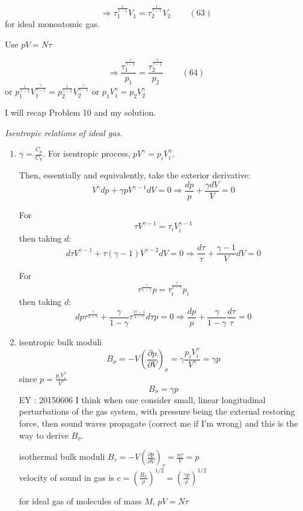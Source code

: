 \begin{equation}
  \Longrightarrow \tau_1^{\frac{1}{\gamma-1}}V_1 = \tau_2^{\frac{1}{\gamma-1}}V_2 \quad \quad \, (63)
\end{equation}
for ideal monoatomic gas.  

Use $pV = N\tau$

\begin{equation}
\Longrightarrow \frac{ \tau_1^{\frac{\gamma}{\gamma-1}} }{p_1} = \frac{ \tau_2^{\frac{\gamma}{\gamma-1}} }{p_2} \quad \quad \, (64)
\end{equation}
or $p_1^{\frac{1}{\gamma-1}}V_1^{\frac{\gamma}{\gamma-1}} = p_2^{\frac{1}{\gamma-1}}V_2^{\frac{\gamma}{\gamma-1}}$ or $p_1V_1^{\gamma} = p_2 V_2^{\gamma}$

I will recap Problem 10 and my solution.  

\emph{Isentropic relations of ideal gas.}

\begin{enumerate}
  \item[(a)] $\gamma = \frac{C_p}{C_V}$.  For isentropic process, $pV^{\gamma} = p_i V_i^{\gamma}$.  

Then, essentially and equivalently, take the exterior derivative:
\[
V^{\gamma}dp + \gamma p V^{\gamma -1} dV = 0 \Longrightarrow \frac{dp}{p} + \frac{\gamma dV}{ V} = 0 
\]

For 
\[
\tau V^{\gamma-1} = \tau_i V_i^{\gamma-1}
\]
then taking $d$:
\[
d\tau V^{\gamma-1} + \tau(\gamma -1) V^{\gamma -2} dV = 0 \Longrightarrow \frac{d\tau}{\tau } + \frac{ \gamma -1}{V} dV = 0 
\]

For 
\[
\tau^{ \frac{ \gamma}{ 1 - \gamma }} p = \tau_i^{\frac{ \gamma}{ 1 - \gamma } } p_i
\]
then taking $d$:
\[
dp \tau^{ \frac{\gamma}{1- \gamma }} + \frac{ \gamma }{ 1 - \gamma} \tau^{ \frac{2 \gamma -1 }{ 1- \gamma }} d\tau p = 0 \Longrightarrow \frac{dp}{p} + \frac{ \gamma }{ 1 - \gamma} \frac{d\tau}{\tau} = 0 
\]
  \item[(b)] isentropic bulk moduli
\[
B_{\sigma} = -V \left( \frac{ \partial p }{ \partial V} \right)_{\sigma} = \gamma \frac{ p_i V_i^{\gamma }}{ V^{\gamma }} = \gamma p
\]
since $p = \frac{ p_i V_i^{\gamma }}{ V^{\gamma}}$
\[
\boxed{ B_{\sigma} = \gamma p }
\]
EY : 20150606 I think when one consider small, linear longitudinal perturbations of the gas system, with pressure being the external restoring force, then sound waves propagate (correct me if I'm wrong) and this is the way to derive $B_{\sigma}$.  

isothermal bulk moduli $B_{\tau} = -V \left( \frac{ \partial p }{ \partial V }\right)_{\tau} = \frac{n\tau}{V} = p$
 \\
velocity of sound in gas is $c = \left( \frac{ B_{\sigma}}{ \rho } \right)^{1/2} = \left( \frac{ \gamma p }{ \rho } \right)^{1/2}$

for ideal gas of molecules of mass $M$, $pV = N\tau$

\end{enumerate}

